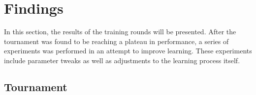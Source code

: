 \section{Findings}
\label{sec:findings}

In this section,
the results of the training rounds will be presented.
%
After the tournament was found to be reaching a plateau in performance,
a series of experiments was performed in an attempt to improve learning.
%
These experiments include parameter tweaks as well as adjustments to the
learning process itself.


\subsection{Tournament}






%
